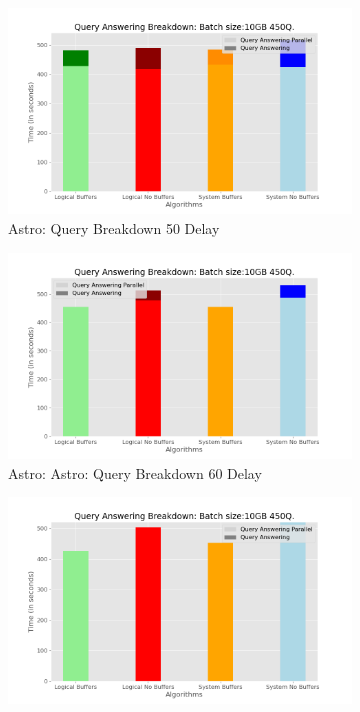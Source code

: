 \begin{figure}
	\centering
	\begin{subfigure}[c]{0.45\textwidth}
		\includegraphics[width=1\textwidth]   {figures/Experiments/Dynamic/ASTRO/breakdown_astro_50.png}
		\caption{Astro: Query Breakdown 50 Delay}
		\label{fig:actual-query-breakdown-50-astro}
	\end{subfigure}
	\begin{subfigure}[c]{0.45\textwidth}
		\includegraphics[width=1\textwidth]	 {figures/Experiments/Dynamic/ASTRO/breakdown_astro_60.png}
		\caption{Astro: Astro: Query Breakdown 60 Delay}
		\label{fig:actual-query-breakdown-60-astro}
	\end{subfigure}
	\begin{subfigure}[c]{0.45\textwidth}
		\includegraphics[width=1\textwidth]	 {figures/Experiments/Dynamic/ASTRO/breakdown_astro_70.png}

\end{subfigure}
\end{figure}
